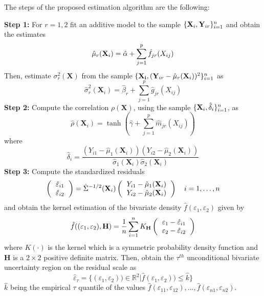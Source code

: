 The steps of  the proposed estimation algorithm are the following:

\noindent
\textbf{Step 1:} For $r=1,2$ fit an additive model to the sample $\{{\bf X}_i, {\bf Y}_{ir}\}_{i=1}^n$ and obtain the estimates
\begin{equation}
\hat \mu_{r}({ \bf X}_i)=\hat \alpha+ \sum_{j=1}^p \hat f_{jr}(X_{ij}) 
\label{am1}
\end{equation}
\noindent
Then,  estimate $\sigma_{r}^2(\textbf{X})$  from the sample $\{{\bf X_i}, ({\bf Y}_{ir} - \hat \mu_r({\bf X}_i))^2\}_{i=1}^n$ as 
\begin{equation}
\hat \sigma_{r}^2(\textbf{X}_i)= \hat \beta_r + \sum_{j=1}^p \hat g_{jr}(X_{ij})
\label{am2}
\end{equation}
\noindent
\textbf{Step 2:} Compute the correlation $\rho (\textbf{X})$, using the sample $\{{\bf X}_i, \hat{\delta}_i\}_{i=1}^n$,  as
\[
\hat \rho (\textbf{X}_i)= \tanh \left( {\hat \gamma + \sum_{j=1}^p \hat m_{jr}(X_{ij})}\right)
\]
\noindent
where 
\[
\hat{\delta}_i = 
\frac{\left(
	Y_{i1}-\hat{\mu}_1(\textbf{X}_i)\right)\left(Y_{i2}-\hat{\mu}_2(\textbf{X}_i)
	\right)}{\hat{\sigma}_1(\textbf{X}_i)\hat{\sigma}_2(\textbf{X}_i)}
\]
\noindent
\textbf{Step 3:} Compute the standardized residuals 
\begin{equation}
\left({
	\begin{tabular} {c}
	$\hat{\varepsilon}_{i1}$ \\
	$\hat{\varepsilon}_{i2}$\\
	\end{tabular}
}\right)
=
\hat{\Sigma}^{-1/2}(\textbf{X}_i)
\left({
	\begin{tabular} {c}
	$Y_{i1} - \hat{\mu}_1(\textbf{X}_i)$\\
	$Y_{i2} - \hat{\mu}_2(\textbf{X}_i)$  \\
	\end{tabular}}\right)
\quad i=1,\ldots,n
\end{equation}
\noindent and obtain the kernel estimation of the bivariate density $\hat{f}(\varepsilon_1,\varepsilon_2)$ given by
\begin{equation}
\hat{f}((\varepsilon_{1},\varepsilon_{2}),\textbf{H}) = \frac{1}{n}\sum_{i=1}^{n}K_{\textbf{H}}
\left({
	\begin{tabular} {c}
	$\varepsilon_1 - \hat{\varepsilon}_{i1}$ \\
	$\varepsilon_2 - \hat{\varepsilon}_{i2}$\\
	\end{tabular}
}\right)
\end{equation}
\noindent where $K(\cdot)$ is the kernel which is a symmetric probability density function and $\textbf{H}$ is a $2 \times 2$ positive definite matrix. Then, obtain the $\tau^{th}$ unconditional bivariate uncertainty region on the residual scale  as
\begin{equation}
\hat{\varepsilon}_{\tau} = \{(\varepsilon_{1},\varepsilon_{2})) \in \mathbb{R}^2 | \hat{f}(\varepsilon_{1},\varepsilon_{2}))\leq\hat{k}\} 
\label{step4}
\end{equation}
\noindent
$\hat k$ being the empirical $\tau$  quantile of the values $\hat f(\varepsilon_{11},\varepsilon_{12}), \ldots,  \hat f(\varepsilon_{n1},\varepsilon_{n2})$. 

